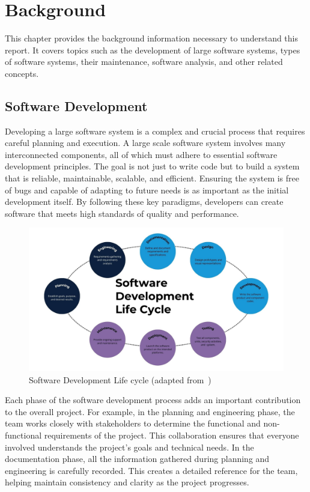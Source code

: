 \chapter{Background}

This chapter provides the background information necessary to understand this report. It covers topics such as the development of large software systems, types of software systems, their maintenance, software analysis, and other related concepts.

\section{Software Development}

Developing a large software system is a complex and crucial process that requires careful planning and execution. A large scale software system involves many interconnected components, all of which must adhere to essential software development principles. The goal is not just to write code but to build a system that is reliable, maintainable, scalable, and efficient. Ensuring the system is free of bugs and capable of adapting to future needs is as important as the initial development itself. By following these key paradigms, developers can create software that meets high standards of quality and performance.

\begin{figure}[H]
    \centering
    \includegraphics[width=1\textwidth]{figures/software_development.png}
    \caption{Software Development Life cycle (adapted from~\citep{sire_sdlc_2024})}
	\label{fig_background_sd}
\end{figure}

Each phase of the software development process adds an important contribution to the overall project. For example, in the planning and engineering phase, the team works closely with stakeholders to determine the functional and non-functional requirements of the project. This collaboration ensures that everyone involved understands the project's goals and technical needs. In the documentation phase, all the information gathered during planning and engineering is carefully recorded. This creates a detailed reference for the team, helping maintain consistency and clarity as the project progresses.

